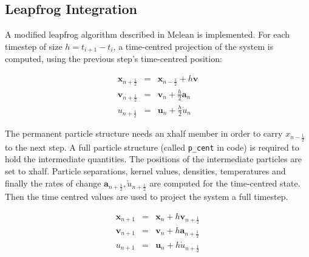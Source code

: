 \subsection{Leapfrog Integration}
A modified leapfrog algorithm described in Melean
\cite[]{melean_coalescence_2005} is implemented. For each timestep of size
$h=t_{i+1} - t_{i}$, a time-centred projection of the system is computed, using
the previous step's time-centred position:

\begin{eqnarray}
\label{leapfrog_x1}
\mathbold{x}_{n+\frac{1}{2}} &=& \mathbold{x}_{n-\frac{1}{2}} + h\mathbold{v} \\
\label{leapfrog_v1}
\mathbold{v}_{n+\frac{1}{2}} &=& \mathbold{v}_{n} + \frac{h}{2} \mathbold{a}_{n} \\
\label{leapfrog_u1}
u_{n+\frac{1}{2}} &=& \mathbold{u}_{n} + \frac{h}{2} \dot{u}_{n}
\end{eqnarray}

The permanent particle structure needs an xhalf member in order to carry
$x_{n-\frac{1}{2}}$ to the next step. A full particle structure (called
\texttt{p\_cent} in code) is required to hold the intermediate quantities. The
positions of the intermediate particles are set to xhalf.  Particle
separations, kernel values, densities, temperatures and finally the rates of
change $\mathbold{a}_{n+\frac{1}{2}}, \dot{u}_{n+\frac{1}{2}}$ are computed for
the time-centred state.  Then the time centred values are used to project the
system a full timestep.

\begin{eqnarray} \label{leapfrog_x2}
\mathbold{x}_{n+1} &=& \mathbold{x}_{n} + h \mathbold{v}_{n + \frac{1}{2} } \\
\label{leapfrog_v2}
\mathbold{v}_{n+1} &=& \mathbold{v}_{n} + h \mathbold{a}_{n + \frac{1}{2} } \\
\label{leapfrog_u2}
u_{n+1} &=& \mathbold{u}_{n} + h \dot{u}_{n + \frac{1}{2} }
\end{eqnarray}


